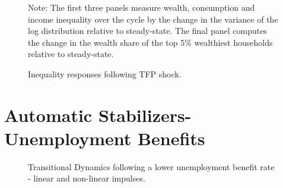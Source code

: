\begin{figure}[H]
\caption[Caption for LOF]{Inequality responses following TFP shock.}
\label{fig:Inequality_response}
\centering
 {\scriptsize  Note: The first three panels measure wealth, consumption and income inequality over the cycle by the change in the variance of the log distribution relative to steady-state. The final panel computes the change in the wealth share of the top 5\% wealthiest households relative to steady-state.  }
\end{figure}


\section{Automatic Stabilizers- Unemployment Benefits}

\begin{figure}[H]
\caption[Caption for LOF]{Transitional Dynamics following a lower unemployment benefit rate - linear and non-linear impulses.}
\label{fig:Lower_b_Transitional}
\end{figure}



